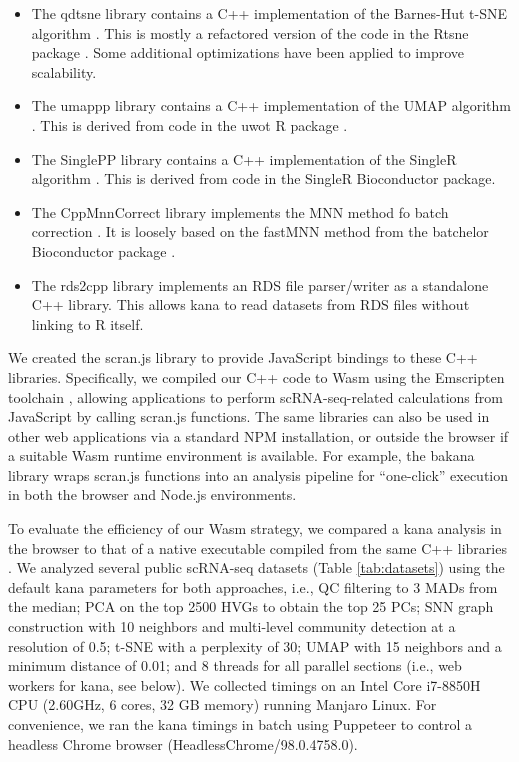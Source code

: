 \documentclass{article}
\begin{document}
\begin{itemize}
\item The qdtsne library \cite{qdtsne} contains a C++ implementation of the Barnes-Hut t-SNE algorithm \cite{maaten2014accelerating}.
This is mostly a refactored version of the code in the Rtsne package \cite{rtsne}.
Some additional optimizations have been applied to improve scalability.
\item The umappp library \cite{umappp} contains a C++ implementation of the UMAP algorithm \cite{mcinnes2018umap}.
This is derived from code in the uwot R package \cite{uwot}.
\item The SinglePP library \cite {singlepp} contains a C++ implementation of the SingleR algorithm \cite{aran2019reference}.
This is derived from code in the SingleR Bioconductor package. 
\item The CppMnnCorrect library \cite{cppmnncorrect} implements the MNN method fo batch correction \cite{haghverdi2018batch}.
It is loosely based on the fastMNN method from the batchelor Bioconductor package \cite{batchelorbioc}.
\item The rds2cpp library \cite{rds2cpp} implements an RDS file parser/writer as a standalone C++ library.
This allows kana to read datasets from RDS files without linking to R itself. 
\end{itemize}

We created the scran.js library \cite{scran.js} to provide JavaScript bindings to these C++ libraries.
Specifically, we compiled our C++ code to Wasm using the Emscripten toolchain \cite{zakai2011emscripten},
allowing applications to perform scRNA-seq-related calculations from JavaScript by calling scran.js functions. 
The same libraries can also be used in other web applications via a standard NPM installation, 
or outside the browser if a suitable Wasm runtime environment is available.
For example, the bakana library wraps scran.js functions into an analysis pipeline for ``one-click'' execution in both the browser and Node.js environments.

To evaluate the efficiency of our Wasm strategy, 
we compared a kana analysis in the browser to that of a native executable compiled from the same C++ libraries \cite{scrancli}.
We analyzed several public scRNA-seq datasets (Table \ref{tab:datasets}) using the default kana parameters for both approaches, i.e.,
QC filtering to 3 MADs from the median;
PCA on the top 2500 HVGs to obtain the top 25 PCs;
SNN graph construction with 10 neighbors and multi-level community detection at a resolution of 0.5;
t-SNE with a perplexity of 30;
UMAP with 15 neighbors and a minimum distance of 0.01;
and 8 threads for all parallel sections (i.e., web workers for kana, see below).
We collected timings on an Intel Core i7-8850H CPU (2.60GHz, 6 cores, 32 GB memory) running Manjaro Linux.
For convenience, we ran the kana timings in batch using Puppeteer \cite{puppeteer} to control a headless Chrome browser (HeadlessChrome/98.0.4758.0). 
\end{document}
